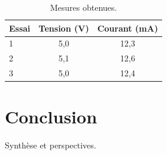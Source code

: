 \documentclass[a4paper,11pt]{article}
\begin{document}
\begin{table}[htbp]
  \centering
  \caption{Mesures obtenues.}
  \label{tab:resultats}
  \begin{tabular}{lcc}
    \toprule
    \textcolor{accent}{\textbf{Essai}} &
    \textcolor{accent}{\textbf{Tension (V)}} &
    \textcolor{accent}{\textbf{Courant (mA)}} \\
    \midrule
    1 & 5{,}0 & 12{,}3 \\
    2 & 5{,}1 & 12{,}6 \\
    3 & 5{,}0 & 12{,}4 \\
    \bottomrule
  \end{tabular}
\end{table}

\section{Conclusion}
Synthèse et perspectives.
\end{document}
